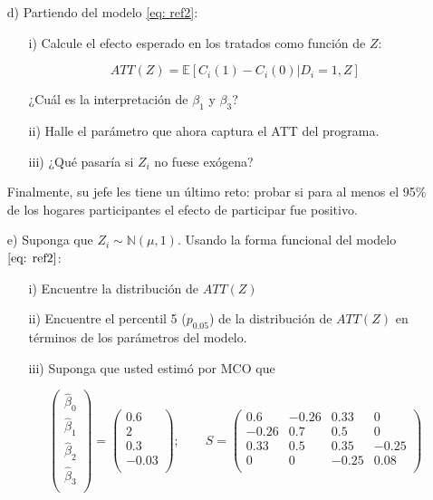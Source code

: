 \documentclass[a4paper]{article}
\begin{document}
\begin{itemize}
    \item[d)] Partiendo del modelo \eqref{eq: ref2}: 

\begin{itemize}
    \item[i)] Calcule el efecto esperado en los tratados como función de $Z$:
    
    $$ATT(Z)=\mathbb{E}[C_i(1)-C_i(0)| D_i=1,Z]$$
    
    ¿Cuál es la interpretación de $\beta_1$ y $\beta_3$? 
    
    \item[ii)] Halle el parámetro que ahora captura el ATT del programa.
    
    \item[iii)] ¿Qué pasaría si $Z_i$ no fuese exógena?
    

\end{itemize}

Finalmente, su jefe les tiene un último reto: probar si para al menos el 95\% de los hogares participantes el efecto de participar fue positivo.

\item[e)] Suponga que $Z_i \sim \mathbb{N}(\mu,1)$. Usando la forma funcional del modelo $\eqref{eq: ref2}$:

\begin{itemize}
    \item[i)] Encuentre la distribución de $ATT(Z)$
    
    \item[ii)] Encuentre el percentil 5 ($p_{0.05}$) de la distribución de $ATT(Z)$ en términos de los parámetros del modelo.
    
    \item[iii)] Suponga que usted estimó por MCO que
    
    \[
    \begin{pmatrix}
    \hat{\beta}_0\\
    \hat{\beta}_1\\
    \hat{\beta}_2\\
    \hat{\beta}_3\\
    \end{pmatrix}=
     \begin{pmatrix}
    0.6\\
    2\\
    0.3\\
    -0.03\\
    \end{pmatrix}; \qquad
    S= 
     \begin{pmatrix}
    0.6 & -0.26 & 0.33 & 0\\
    -0.26 & 0.7 & 0.5 & 0\\
    0.33 & 0.5 & 0.35 & -0.25\\
    0 & 0 & -0.25 & 0.08\\
    \end{pmatrix}
    \]
    

\end{itemize}
\end{itemize}
\end{document}
